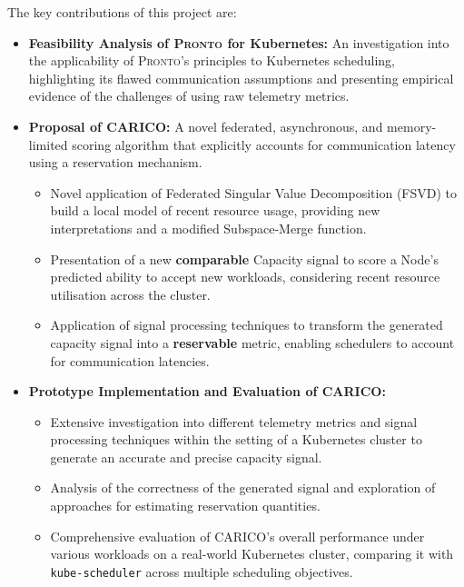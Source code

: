 The key contributions of this project are:
\begin{itemize}
    \item \textbf{Feasibility Analysis of \textsc{Pronto} for Kubernetes:} An
        investigation into the applicability of \textsc{Pronto}'s principles to
        Kubernetes scheduling, highlighting its flawed communication assumptions and
        presenting empirical evidence of the challenges of using raw telemetry
        metrics.
    \item \textbf{Proposal of \textsc{CARICO}:} A novel federated, asynchronous,
        and memory-limited scoring algorithm that explicitly accounts for
        communication latency using a reservation mechanism.
    \begin{itemize}
        \item Novel application of Federated Singular Value Decomposition (FSVD)
            to build a local model of recent resource usage, providing new
            interpretations and a modified Subspace-Merge function.
        \item Presentation of a new \textbf{comparable} Capacity signal to score a Node's
            predicted ability to accept new workloads, considering recent
            resource utilisation across the cluster.
        \item Application of signal processing techniques to transform
            the generated capacity signal into a \textbf{reservable} metric,
            enabling schedulers to account for communication latencies.
    \end{itemize}
    \item \textbf{Prototype Implementation and Evaluation of \textsc{CARICO}:}
    \begin{itemize}
        \item Extensive investigation into different telemetry metrics and
            signal processing techniques within the setting of a Kubernetes
            cluster to generate an accurate and precise capacity signal.
        \item Analysis of the correctness of the generated signal and
            exploration of approaches for estimating reservation quantities.
        \item Comprehensive evaluation of \textsc{CARICO}'s overall performance
            under various workloads on a real-world Kubernetes cluster,
            comparing it with \texttt{kube-scheduler} across multiple scheduling
            objectives.
    \end{itemize}
\end{itemize}

